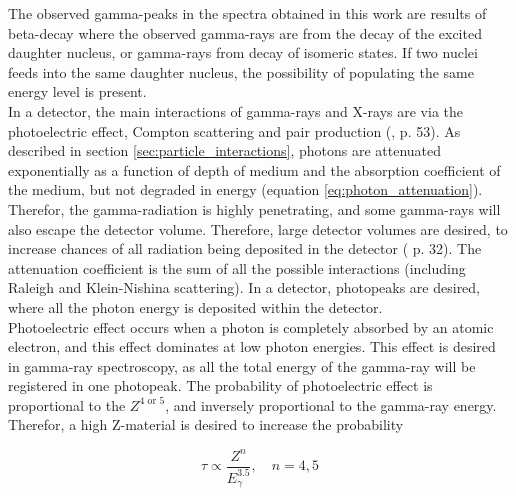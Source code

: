 

The observed gamma-peaks in the spectra obtained in this work are results of beta-decay where the observed gamma-rays are from the decay of the excited daughter nucleus, or gamma-rays from decay of isomeric states. If two nuclei feeds into the same daughter nucleus, the possibility of populating the same energy level is present.\\

\noindent 
In a detector, the main interactions of gamma-rays and X-rays are via the photoelectric effect, Compton scattering and pair production (\cite{Leo1994}, p. 53).  As described in section \ref{sec:particle_interactions}, photons are attenuated exponentially as a function of depth of medium and the absorption coefficient of the medium, but not degraded in energy (equation \ref{eq:photon_attenuation}). Therefor, the gamma-radiation is highly penetrating, and some gamma-rays will also escape the detector volume. Therefore, large detector volumes are desired, to increase chances of all radiation being deposited in the detector ( \cite{Gilmore2008} p. 32). The attenuation coefficient is the sum of all the possible interactions (including Raleigh and Klein-Nishina scattering). In a detector, photopeaks are desired, where all the photon energy is deposited within the detector.  \\ 
\noindent 
Photoelectric effect occurs when a photon is completely absorbed by an atomic electron, and this effect dominates at low photon energies. This effect is desired in gamma-ray spectroscopy, as all the total energy of the gamma-ray will be registered in one photopeak. The probability of photoelectric effect is proportional to the $Z^{4 \text{ or } 5}$, and inversely proportional to the gamma-ray energy. Therefor, a high Z-material is desired to increase the probability

\begin{equation}
    \tau \propto \frac{Z^n}{E_\gamma^{3.5}}, \quad n=4,5
\end{equation}

\noindent

